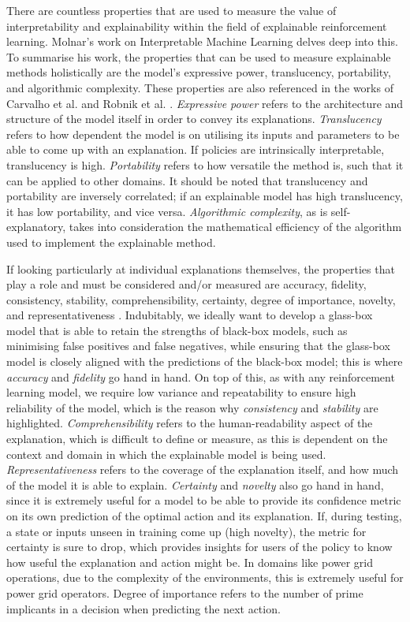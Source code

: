 There are countless properties that are used to measure the value of interpretability and explainability within the field of explainable reinforcement learning. Molnar's \cite{molnar2020interpretable} work on Interpretable Machine Learning delves deep into this. To summarise his work, the properties that can be used to measure explainable methods holistically are the model's expressive power, translucency, portability, and algorithmic complexity. These properties are also referenced in the works of Carvalho et al. \cite{carvalho2019machine} and Robnik et al. \cite{robnik2018perturbation}. \textit{Expressive power} refers to the architecture and structure of the model itself in order to convey its explanations. \textit{Translucency} refers to how dependent the model is on utilising its inputs and parameters to be able to come up with an explanation. If policies are intrinsically interpretable, translucency is high. \textit{Portability} refers to how versatile the method is, such that it can be applied to other domains. It should be noted that translucency and portability are inversely correlated; if an explainable model has high translucency, it has low portability, and vice versa. \textit{Algorithmic complexity}, as is self-explanatory, takes into consideration the mathematical efficiency of the algorithm used to implement the explainable method.

If looking particularly at individual explanations themselves, the properties that play a role and must be considered and/or measured are accuracy, fidelity, consistency, stability, comprehensibility, certainty, degree of importance, novelty, and representativeness \cite{molnar2020interpretable}. Indubitably, we ideally want to develop a glass-box model that is able to retain the strengths of black-box models, such as minimising false positives and false negatives, while ensuring that the glass-box model is closely aligned with the predictions of the black-box model; this is where \textit{accuracy} and \textit{fidelity} go hand in hand. On top of this, as with any reinforcement learning model, we require low variance and repeatability to ensure high reliability of the model, which is the reason why \textit{consistency} and \textit{stability} are highlighted. \textit{Comprehensibility} refers to the human-readability aspect of the explanation, which is difficult to define or measure, as this is dependent on the context and domain in which the explainable model is being used. \textit{Representativeness} refers to the coverage of the explanation itself, and how much of the model it is able to explain. \textit{Certainty} and \textit{novelty} also go hand in hand, since it is extremely useful for a model to be able to provide its confidence metric on its own prediction of the optimal action and its explanation. If, during testing, a state or inputs unseen in training come up (high novelty), the metric for certainty is sure to drop, which provides insights for users of the policy to know how useful the explanation and action might be. In domains like power grid operations, due to the complexity of the environments, this is extremely useful for power grid operators. Degree of importance refers to the number of prime implicants in a decision when predicting the next action.

